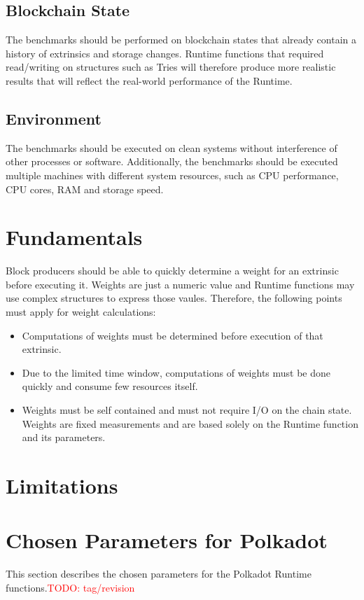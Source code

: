 \documentclass[11pt,a4paper]{article}
\newcommand{\todo}[1]{\textcolor{red}{TODO: #1}}
\begin{document}
\subsection{Blockchain State}
The benchmarks should be performed on blockchain states that already contain a history of
extrinsics and storage changes. Runtime functions that required read/writing on structures
such as Tries will therefore produce more realistic results that will reflect the real-world
performance of the Runtime.

\subsection{Environment}
The benchmarks should be executed on clean systems without interference of other processes
or software. Additionally, the benchmarks should be executed multiple machines with different
system resources, such as CPU performance, CPU cores, RAM and storage speed.

\section{Fundamentals}
Block producers should be able to quickly determine a weight for an extrinsic before executing it.
Weights are just a numeric value and Runtime functions may use complex structures to express those
vaules. Therefore, the following points must apply for weight calculations:
\begin{itemize}
\item Computations of weights must be determined before execution of that extrinsic.
\item Due to the limited time window, computations of weights must be done quickly and consume
      few resources itself.
\item Weights must be self contained and must not require I/O on the chain state. Weights are
      fixed measurements and are based solely on the Runtime function and its parameters.
\end{itemize}

\section{Limitations}

\section{Chosen Parameters for Polkadot}
This section describes the chosen parameters for the Polkadot Runtime functions.\todo{tag/revision}
\end{document}
